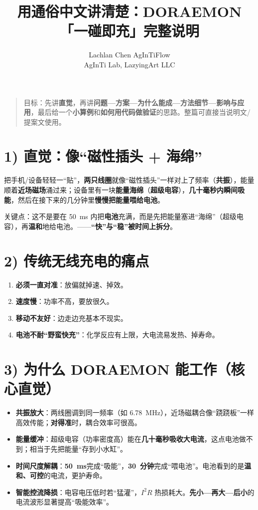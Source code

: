 \documentclass[11pt]{ctexart}
\title{用通俗中文讲清楚：DORAEMON「一碰即充」完整说明}
\author{\begin{tabular}{c}Lachlan Chen \quad AgInTiFlow\\AgInTi Lab, LazyingArt LLC\end{tabular}}
\date{}
\begin{document}
\maketitle

\begin{quote}
目标：先讲\textbf{直觉}，再讲\textbf{问题—方案—为什么能成—方法细节—影响与应用}，最后给一个\textbf{小算例}和\textbf{如何用代码做验证}的思路。整篇可直接当说明文/提案文使用。
\end{quote}

\section{1) 直觉：像“磁性插头 + 海绵”}
把手机/设备轻轻一“贴”，\textbf{两只线圈}就像“磁性插头”一样对上了频率（\textbf{共振}），能量顺着\textbf{近场磁场}涌过来；设备里有一块\textbf{能量海绵}（\textbf{超级电容}），\textbf{几十毫秒内瞬间吸能}，然后在接下来的几分钟里\textbf{慢慢把能量喂给电池}。

关键点：这不是要在 50~ms 内把\textbf{电池}充满，而是先把能量塞进“海绵”（超级电容），再\textbf{温和}地给电池。——\textbf{“快”与“稳”被时间上拆分}。

\section{2) 传统无线充电的痛点}
\begin{enumerate}
  \item \textbf{必须一直对准}：放偏就掉速、掉效。
  \item \textbf{速度慢}：功率不高，要放很久。
  \item \textbf{移动不友好}：边走边充基本不现实。
  \item \textbf{电池不耐“野蛮快充”}：化学反应有上限，大电流易发热、掉寿命。
\end{enumerate}

\section{3) 为什么 DORAEMON 能工作（核心直觉）}
\begin{itemize}
  \item \textbf{共振放大}：两线圈调到同一频率（如 6.78~MHz），近场磁耦合像“跷跷板”一样高效传能；\textbf{对得准}时，耦合效率可很高。
  \item \textbf{能量缓冲}：超级电容（功率密度高）能在\textbf{几十毫秒吸收大电流}，这点电池做不到；相当于先把能量“存到小水缸”。
  \item \textbf{时间尺度解耦}：\textbf{50~ms}完成“吸能”，\textbf{30~分钟}完成“喂电池”。电池看到的是\textbf{温和、可控}的电流，更护寿命。
  \item \textbf{智能控流降损}：电容电压低时若“猛灌”，$I^2R$ 热损耗大。\textbf{先小—再大—后小}的电流波形显著提高“吸能效率”。
\end{itemize}
\end{document}
